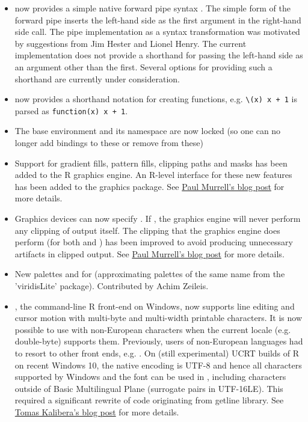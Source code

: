 \begin{itemize}
\item{} \R{} now provides a simple native forward pipe syntax \code{|>}. 
The simple form of the forward pipe inserts the left-hand side as the first
argument in the right-hand side call.  The pipe implementation as a syntax
transformation was motivated by suggestions from Jim Hester and Lionel
Henry.  The current implementation does not provide a shorthand for passing
the left-hand side as an argument other than the first.  Several options for
providing such a shorthand are currently under consideration.

\item{} \R{} now provides a shorthand notation for creating functions,
e.g. \verb|\(x) x + 1| is parsed as \verb|function(x) x + 1|.

\item{} The base environment and its namespace are now locked (so one
 can no longer add bindings to these or remove from these)

\item{} Support for gradient fills, pattern fills, clipping paths and
 masks has been added to the R graphics engine.  An R-level interface
 for these new features has been added to the  graphics
 package.  See
 \href{https://developer.r-project.org/Blog/public/2020/07/15/new-features-in-the-r-graphics-engine}{Paul
   Murrell's blog post} for more details.

\item{} Graphics devices can now specify .  If
 , the graphics engine will never perform any clipping of
 output itself.  The clipping that the graphics engine does perform (for
 both  and ) has been
 improved to avoid producing unnecessary artifacts in clipped output.
 See
 \href{https://developer.r-project.org/Blog/public/2020/06/08/improvements-to-clipping-in-the-r-graphics-engine}{Paul
   Murrell's blog post} for more details.

\item{} New palettes  and  for
 (approximating palettes of the same name from the
'viridisLite' package). Contributed by Achim Zeileis.

\item{} , the command-line R front-end on Windows, now
supports line editing and cursor motion with multi-byte and multi-width
printable characters.  It is now possible to use  with
non-European characters when the current locale (e.g.  double-byte) supports
them.  Previously, users of non-European languages had to resort to other
front ends, e.g.  .  On (still experimental) UCRT builds of R
on recent Windows 10, the native encoding is UTF-8 and hence all characters
supported by Windows and the font can be used in , including
characters outside of Basic Multilingual Plane (surrogate pairs in
UTF-16LE).  This required a significant rewrite of code originating from
getline library.  See
\href{https://developer.r-project.org/Blog/public/2021/04/17/improved-multi-byte-support-in-rterm/}{Tomas
Kalibera's blog post} for more details.


\end{itemize}
